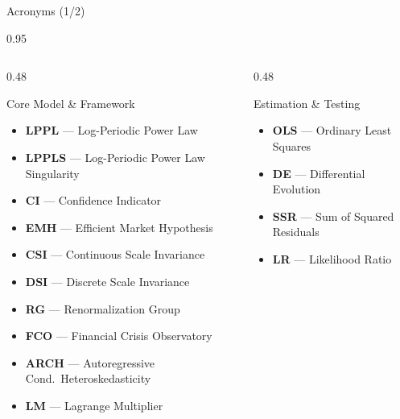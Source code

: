 \documentclass[9pt, aspectratio=169, t]{beamer}
\begin{document}

\begin{frame}{Acronyms (1/2)}
    \begin{cminipage}{0.95\textwidth}
    {\scriptsize
    \begin{columns}[T]
        \begin{column}{0.48\textwidth}
            \begin{block}{Core Model \& Framework}
                \begin{itemize}\setlength{\itemsep}{0pt}
                    \item \textbf{LPPL} --- Log-Periodic Power Law
                    \item \textbf{LPPLS} --- Log-Periodic Power Law Singularity
                    \item \textbf{CI} --- Confidence Indicator
                    \item \textbf{EMH} --- Efficient Market Hypothesis
                    \item \textbf{CSI} --- Continuous Scale Invariance
                    \item \textbf{DSI} --- Discrete Scale Invariance
                    \item \textbf{RG} --- Renormalization Group
                    \item \textbf{FCO} --- Financial Crisis Observatory
                    \item \textbf{ARCH} --- Autoregressive Cond.\ Heteroskedasticity
                    \item \textbf{LM} --- Lagrange Multiplier
                \end{itemize}
            \end{block}
        \end{column}
        \begin{column}{0.48\textwidth}
            \begin{exampleblock}{Estimation \& Testing}
                \begin{itemize}\setlength{\itemsep}{0pt}
                    \item \textbf{OLS} --- Ordinary Least Squares
                    \item \textbf{DE} --- Differential Evolution
                    \item \textbf{SSR} --- Sum of Squared Residuals
                    \item \textbf{LR} --- Likelihood Ratio

\end{itemize}
\end{exampleblock}
\end{column}
\end{columns}}
\end{cminipage}
\end{frame}
\end{document}
